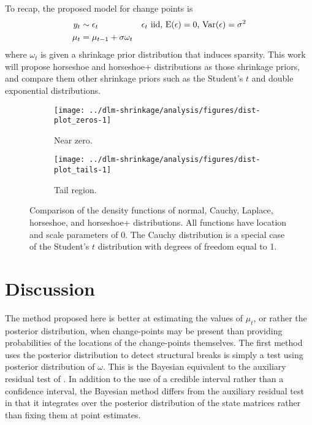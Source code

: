 To recap, the proposed model for change points is
\begin{align}
  \label{dlm:eq:16}
  y_{t} & \sim \epsilon_{t} & \text{$\epsilon_{t}$ iid, $\operatorname{E}(\epsilon) = 0$, $\operatorname{Var}(\epsilon) = \sigma^{2}$} \\
  \mu_{t} &= \mu_{t - 1} + \sigma \omega_{t}
\end{align}
where $\omega_{t}$ is given a shrinkage prior distribution that induces sparsity.
This work will propose horseshoe and horseshoe+ distributions as those shrinkage priors, and compare them other shrinkage priors such as the Student's $t$ and double exponential distributions.


\begin{figure}[!htpb]
 \begin{subfigure}[b]{\linewidth}
   \texttt{[image: ../dlm-shrinkage/analysis/figures/dist-plot\_zeros-1]}
   \caption{Near zero.}
 \end{subfigure}
 \begin{subfigure}[b]{\linewidth}
    \texttt{[image: ../dlm-shrinkage/analysis/figures/dist-plot\_tails-1]}
    \caption{Tail region.}
 \end{subfigure}
  \caption[Comparison of the density functions of normal, Cauchy, Laplace, horseshoe, and horseshoe+ distributions.]{
    Comparison of the density functions of normal, Cauchy, Laplace, horseshoe, and horseshoe+ distributions.
    All functions have location and scale parameters of 0.
    The Cauchy distribution is a special case of the Student's $t$ distribution with degrees of freedom equal to 1.
  }
  \label{dlm:fig:density}
\end{figure}




\section{Discussion}
\label{dlm:sec:ident-change-points}

The method proposed here is better at estimating the values of $\mu_{t}$, or rather the posterior distribution, when change-points may be present than providing probabilities of the locations of the change-points themselves.
The first method uses the posterior distribution to detect structural breaks is simply a test using posterior distribution of $\omega$.
This is the Bayesian equivalent to the auxiliary residual test of \textcite{DeJongPenzer1998}.
In addition to the use of a credible interval rather than a confidence interval, the Bayesian method differs from the auxiliary residual test in that it integrates over the posterior distribution of the state matrices rather than fixing them at point estimates.



